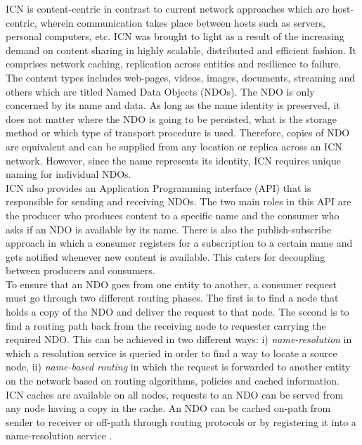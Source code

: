  		 
\noindent ICN  is content-centric in contrast to current network approaches which are  host-centric, wherein communication takes place between hosts such as servers, personal computers, etc. ICN was brought to light as a result of the increasing demand on content sharing in highly scalable, distributed and efficient fashion. It comprises network caching, replication across entities and resilience to failure. The content types includes web-pages, videos, images, documents, streaming and others which are titled Named Data Objects (NDOs). The NDO is only concerned by its name and data. As long as the name identity is preserved, it does not matter where the NDO is going to be persisted, what is the storage method or which type of transport procedure is used. Therefore, copies of NDO are equivalent and can be supplied from any location or replica across an ICN network. However, since the name represents its identity, ICN requires unique naming for individual NDOs.\\

\noindent ICN also provides an Application Programming interface (API) that is responsible for sending and receiving NDOs. The two main roles in this API are the producer who produces content to a specific name and the consumer who asks if an NDO is available by its name. There is also the publish-subscribe approach in which a consumer registers for a subscription to a certain name and gets notified whenever new content is available. This caters for  decoupling between producers and consumers.\\

\noindent To ensure that an NDO goes from one entity to another, a consumer request must go through two different routing phases. The first is to find a node that holds a copy of the  NDO
and deliver the request to that node. The second is to find a routing path back from the receiving node to requester carrying the required NDO. This can be achieved in two different ways: i) \textit{name-resolution} in which a resolution service is queried in order to find a way to locate a source node, ii) \textit{name-based routing} in which the request is forwarded to	 another entity on the network based on routing algorithms, policies and cached information. \\

\noindent ICN caches are available on all nodes, requests to an NDO can be served from any node having a copy in the cache. An NDO can be cached on-path from sender to receiver or off-path through routing protocols or by registering it into a name-resolution service \cite{6231276}.


